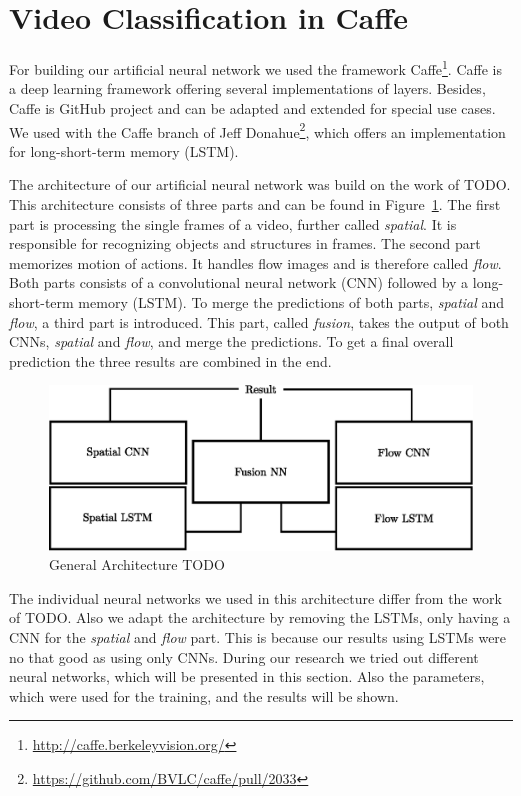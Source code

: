 \section{Video Classification in Caffe}
\label{sec:classification}

For building our artificial neural network we used the framework Caffe\footnote{\url{http://caffe.berkeleyvision.org/}}.
Caffe is a deep learning framework offering several implementations of layers.
Besides, Caffe is GitHub project and can be adapted and extended for special use cases.
We used with the Caffe branch of Jeff Donahue\footnote{\url{https://github.com/BVLC/caffe/pull/2033}}, which offers an implementation for long-short-term memory (LSTM).

The architecture of our artificial neural network was build on the work of TODO.
This architecture consists of three parts and can be found in Figure~\ref{fig:architecture}.
The first part is processing the single frames of a video, further called \emph{spatial}.
It is responsible for recognizing objects and structures in frames.
The second part memorizes motion of actions.
It handles flow images and is therefore called \emph{flow}.
Both parts consists of a convolutional neural network (CNN) followed by a long-short-term memory (LSTM).
To merge the predictions of both parts, \emph{spatial} and \emph{flow}, a third part is introduced.
This part, called \emph{fusion}, takes the output of both CNNs, \emph{spatial} and \emph{flow}, and merge the predictions.
To get a final overall prediction the three results are combined in the end.

\begin{figure}[!htb]
	\centering
	\includegraphics[scale=.7]{images/architecture.eps}
	\caption{General Architecture TODO}
	\label{fig:architecture}
\end{figure}

The individual neural networks we used in this architecture differ from the work of TODO.
Also we adapt the architecture by removing the LSTMs, only having a CNN for the \emph{spatial} and \emph{flow} part.
This is because our results using LSTMs were no that good as using only CNNs.
During our research we tried out different neural networks, which will be presented in this section.
Also the parameters, which were used for the training, and the results will be shown.

